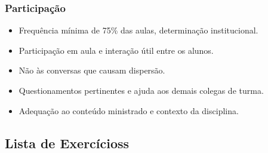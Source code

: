 \begin{frame}[t]\frametitle{Participação}

  \begin{itemize}
    \justifying{}
    \setlength\itemsep{1em}
    \item Frequência mínima de 75\% das aulas, determinação institucional.
    \item Participação em aula e interação útil entre os alunos.
    \item Não às conversas que causam dispersão.
    \item Questionamentos pertinentes e ajuda aos demais colegas de turma.
    \item Adequação ao conteúdo ministrado e contexto da disciplina.
  \end{itemize}

\end{frame}



\subsection[Lista de Exercícioss]{Lista de Exercícioss}\label{subsec:planejamento-lista}



